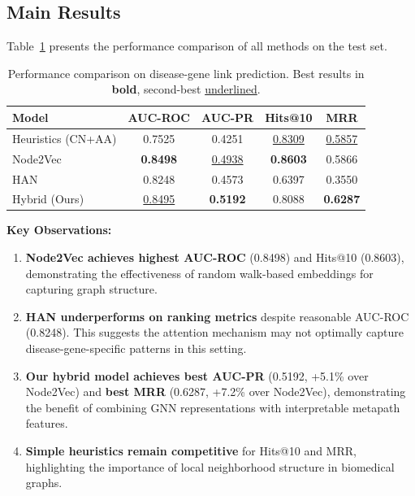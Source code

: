 \documentclass{article}
\begin{document}
\subsection{Main Results}

Table~\ref{tab:main_results} presents the performance comparison of all methods on the test set.

\begin{table}[t]
\centering
\caption{Performance comparison on disease-gene link prediction. Best results in \textbf{bold}, second-best \underline{underlined}.}
\label{tab:main_results}
\begin{tabular}{lcccc}
\toprule
\textbf{Model} & \textbf{AUC-ROC} & \textbf{AUC-PR} & \textbf{Hits@10} & \textbf{MRR} \\
\midrule
Heuristics (CN+AA) & 0.7525 & 0.4251 & \underline{0.8309} & \underline{0.5857} \\
Node2Vec & \textbf{0.8498} & \underline{0.4938} & \textbf{0.8603} & 0.5866 \\
HAN & 0.8248 & 0.4573 & 0.6397 & 0.3550 \\
\midrule
Hybrid (Ours) & \underline{0.8495} & \textbf{0.5192} & 0.8088 & \textbf{0.6287} \\
\bottomrule
\end{tabular}
\end{table}

\textbf{Key Observations:}

\begin{enumerate}
    \item \textbf{Node2Vec achieves highest AUC-ROC} (0.8498) and Hits@10 (0.8603), demonstrating the effectiveness of random walk-based embeddings for capturing graph structure.

    \item \textbf{HAN underperforms on ranking metrics} despite reasonable AUC-ROC (0.8248). This suggests the attention mechanism may not optimally capture disease-gene-specific patterns in this setting.

    \item \textbf{Our hybrid model achieves best AUC-PR} (0.5192, +5.1\% over Node2Vec) and \textbf{best MRR} (0.6287, +7.2\% over Node2Vec), demonstrating the benefit of combining GNN representations with interpretable metapath features.

    \item \textbf{Simple heuristics remain competitive} for Hits@10 and MRR, highlighting the importance of local neighborhood structure in biomedical graphs.
\end{enumerate}
\end{document}
